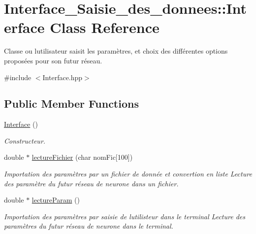 \hypertarget{class_interface___saisie__des__donnees_1_1_interface}{}\section{Interface\+\_\+\+Saisie\+\_\+des\+\_\+donnees\+:\+:Interface Class Reference}
\label{class_interface___saisie__des__donnees_1_1_interface}


Classe ou l\textquotesingle{}utilisateur saisit les paramètres, et choix des différentes options proposées pour son futur réseau.  




{\ttfamily \#include $<$Interface.\+hpp$>$}

\subsection*{Public Member Functions}
\begin{DoxyCompactItemize}
\item 
\hyperlink{class_interface___saisie__des__donnees_1_1_interface_a72c791f0d80f2f93845f61ad679f11ec}{Interface} ()
\begin{DoxyCompactList}\small\item\em Constructeur. \end{DoxyCompactList}\item 
double $\ast$ \hyperlink{class_interface___saisie__des__donnees_1_1_interface_a5cd79d6131ec57d8e32f74772ee553b2}{lecture\+Fichier} (char nom\+Fic\mbox{[}100\mbox{]})
\begin{DoxyCompactList}\small\item\em Importation des paramètres par un fichier de donnée et convertion en liste Lecture des paramètre du futur réseau de neurone dans un fichier. \end{DoxyCompactList}\item 
double $\ast$ \hyperlink{class_interface___saisie__des__donnees_1_1_interface_a290c3761a31998630c1245c8a4b7ef5a}{lecture\+Param} ()
\begin{DoxyCompactList}\small\item\em Importation des paramètres par saisie de l\textquotesingle{}utilisteur dans le terminal Lecture des paramètres du futur réseau de neurone dans le terminal. \end{DoxyCompactList}\end{DoxyCompactItemize}


